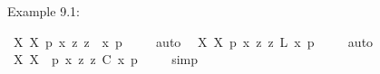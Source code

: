 \begin{isabellebody}
\begin{isamarkuptext}
Example 9.1:%
\end{isamarkuptext}\isamarkuptrue%
\isamarkupfalse%
\ {\isachardoublequoteopen}{\isasymlfloor}{\isacharparenleft}{\isacharparenleft}{\isasymlambda}X{\isachardot}\ \isactrlbold {\isasymbox}{\isacharparenleft}X\ {\isasymdownharpoonleft}{\isacharparenleft}p{\isacharcolon}{\isacharcolon}{\isasymup}{\isasymzero}{\isacharparenright}{\isacharparenright}{\isacharparenright}\ \isactrlbold {\isasymdown}{\isacharparenleft}{\isasymlambda}x{\isachardot}\ \isactrlbold {\isasymdiamond}{\isacharparenleft}{\isasymlambda}z{\isachardot}\ z\ \isactrlbold {\isasymapprox}\ x{\isacharparenright}\ {\isasymdownharpoonleft}p{\isacharparenright}{\isacharparenright}{\isasymrfloor}{\isachardoublequoteclose}\ \isanewline
%
\ \ %
%
\isamarkupfalse%
\ auto\ %
%
%
\isanewline
%
\isamarkupfalse%
\ {\isachardoublequoteopen}{\isasymlfloor}{\isacharparenleft}{\isacharparenleft}{\isasymlambda}X{\isachardot}\ \isactrlbold {\isasymbox}{\isacharparenleft}X\ {\isasymdownharpoonleft}{\isacharparenleft}p{\isacharcolon}{\isacharcolon}{\isasymup}{\isasymzero}{\isacharparenright}{\isacharparenright}{\isacharparenright}\ \isactrlbold {\isasymdown}{\isacharparenleft}{\isasymlambda}x{\isachardot}\ \isactrlbold {\isasymdiamond}{\isacharparenleft}{\isasymlambda}z{\isachardot}\ z\ \isactrlbold {\isasymapprox}\isactrlsup L\ x{\isacharparenright}\ {\isasymdownharpoonleft}p{\isacharparenright}{\isacharparenright}{\isasymrfloor}{\isachardoublequoteclose}\ \isanewline
%
\ \ %
%
\isamarkupfalse%
\ auto\ %
%
%
\isanewline
%
\isamarkupfalse%
\ {\isachardoublequoteopen}{\isasymlfloor}{\isacharparenleft}{\isacharparenleft}{\isasymlambda}X{\isachardot}\ \isactrlbold {\isasymbox}{\isacharparenleft}X\ \ {\isacharparenleft}p{\isacharcolon}{\isacharcolon}{\isasymup}{\isasymzero}{\isacharparenright}{\isacharparenright}{\isacharparenright}\ \isactrlbold {\isasymdown}{\isacharparenleft}{\isasymlambda}x{\isachardot}\ \isactrlbold {\isasymdiamond}{\isacharparenleft}{\isasymlambda}z{\isachardot}\ z\ \isactrlbold {\isasymapprox}\isactrlsup C\ x{\isacharparenright}\ p{\isacharparenright}{\isacharparenright}{\isasymrfloor}{\isachardoublequoteclose}\ \isanewline
%
\ \ %
%
\isamarkupfalse%
\ simp\ \ %
%
%
%
%
\isamarkuptrue%
%
\begin{isamarkuptext}%

\end{isamarkuptext}
\end{isabellebody}
